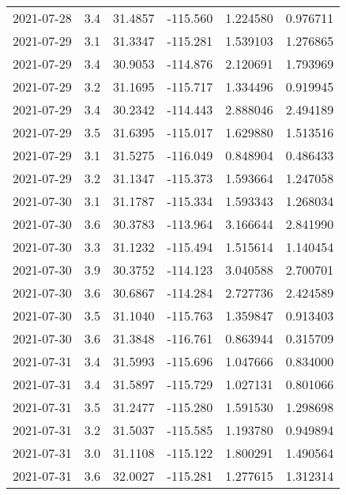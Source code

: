 \begin{tabular}{lrrrrr}
2021-07-28 &       3.4 &  31.4857 &  -115.560 &         1.224580 &         0.976711 \\
2021-07-29 &       3.1 &  31.3347 &  -115.281 &         1.539103 &         1.276865 \\
2021-07-29 &       3.4 &  30.9053 &  -114.876 &         2.120691 &         1.793969 \\
2021-07-29 &       3.2 &  31.1695 &  -115.717 &         1.334496 &         0.919945 \\
2021-07-29 &       3.4 &  30.2342 &  -114.443 &         2.888046 &         2.494189 \\
2021-07-29 &       3.5 &  31.6395 &  -115.017 &         1.629880 &         1.513516 \\
2021-07-29 &       3.1 &  31.5275 &  -116.049 &         0.848904 &         0.486433 \\
2021-07-29 &       3.2 &  31.1347 &  -115.373 &         1.593664 &         1.247058 \\
2021-07-30 &       3.1 &  31.1787 &  -115.334 &         1.593343 &         1.268034 \\
2021-07-30 &       3.6 &  30.3783 &  -113.964 &         3.166644 &         2.841990 \\
2021-07-30 &       3.3 &  31.1232 &  -115.494 &         1.515614 &         1.140454 \\
2021-07-30 &       3.9 &  30.3752 &  -114.123 &         3.040588 &         2.700701 \\
2021-07-30 &       3.6 &  30.6867 &  -114.284 &         2.727736 &         2.424589 \\
2021-07-30 &       3.5 &  31.1040 &  -115.763 &         1.359847 &         0.913403 \\
2021-07-30 &       3.6 &  31.3848 &  -116.761 &         0.863944 &         0.315709 \\
2021-07-31 &       3.4 &  31.5993 &  -115.696 &         1.047666 &         0.834000 \\
2021-07-31 &       3.4 &  31.5897 &  -115.729 &         1.027131 &         0.801066 \\
2021-07-31 &       3.5 &  31.2477 &  -115.280 &         1.591530 &         1.298698 \\
2021-07-31 &       3.2 &  31.5037 &  -115.585 &         1.193780 &         0.949894 \\
2021-07-31 &       3.0 &  31.1108 &  -115.122 &         1.800291 &         1.490564 \\
2021-07-31 &       3.6 &  32.0027 &  -115.281 &         1.277615 &         1.312314 \\

\end{tabular}
